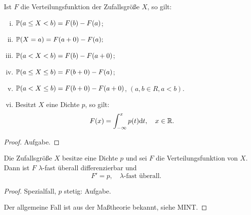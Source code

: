 \begin{lem}
  Ist $F$ die Verteilungsfunktion der Zufallsgröße $X$, so gilt:
  \begin{enumerate}[(i)]
  \item $\mathbb{P} (a \le X < b) = F(b) - F(a)$;
  \item $\mathbb{P} (X = a) = F (a + 0) - F (a);$\footnotemark
  \item $\mathbb{P} (a < X < b) = F(b) - F(a + 0)$;
  \item $\mathbb{P} (a \le X \le b) = F (b + 0) - F(a)$;
  \item $\mathbb{P} (a < X \le b) = F (b + 0) - F (a + 0)$, $(a, b \in R, a < b)$.
  \item Besitzt $X$ eine Dichte $p$, so gilt:
    \[ F(x) = \int_{-\infty}^x p(t) \mathrm{d} t, \quad x \in \mathbb{R}. \]
  \end{enumerate}
\end{lem}

\begin{proof}
  Aufgabe.
\end{proof}

\begin{thm}
 Die Zufallsgröße $X$ besitze eine Dichte $p$ und sei $F$ die
 Verteilungsfunktion von $X$. Dann ist $F$ $\lambda$-fast überall
 differenzierbar und
 \[ F' = p, \quad \lambda\text{-fast überall.} \]
\end{thm}

\begin{proof}
  Spezialfall, $p$ stetig: Aufgabe.
  
  Der allgemeine Fall ist aus der Maßtheorie bekannt, siehe MINT.
\end{proof}

